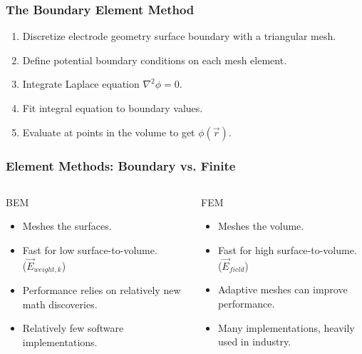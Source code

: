 \documentclass[xcolor=dvipsnames]{beamer}
\begin{document}
\begin{frame}
  \frametitle{The Boundary Element Method}

  \begin{enumerate}
  \item Discretize electrode geometry surface boundary with a triangular mesh.
  \item Define potential boundary conditions on each mesh element.
  \item Integrate Laplace equation $\nabla^2\phi=0$.
  \item Fit integral equation to boundary values.
  \item Evaluate at points in the volume to get $\phi(\vec{r})$.
  \end{enumerate}
\end{frame}

\begin{frame}
  \frametitle{Element Methods: Boundary vs. Finite}
  \begin{columns}
    \begin{column}{0.5\textwidth}
      BEM
      \begin{itemize}
      \item Meshes the surfaces.
      \item Fast for low surface-to-volume.\\($\vec{E}_{weight,k}$)
      \item Performance relies on relatively new math discoveries.
      \item Relatively few software implementations.
      \end{itemize}      
    \end{column}
    \begin{column}{0.5\textwidth}
      FEM
      \begin{itemize}
      \item Meshes the volume.
      \item Fast for high surface-to-volume.\\($\vec{E}_{field}$)
      \item Adaptive meshes can improve performance.
      \item Many implementations, heavily used in industry.
      \end{itemize}      
    \end{column}
  \end{columns}
\end{frame}
\end{document}
